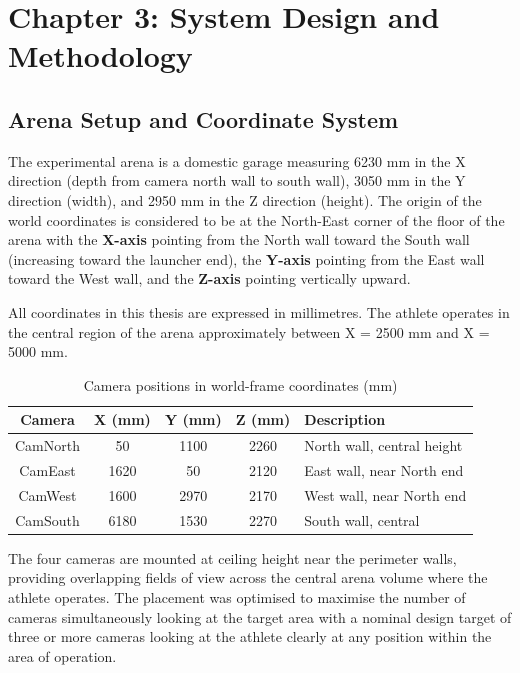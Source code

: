 \chapter{Chapter 3: System Design and Methodology}

\section{Arena Setup and Coordinate System}

The experimental arena is a domestic garage measuring 6230 mm in the X direction (depth from camera north wall to south wall), 3050 mm in the Y direction (width), and 2950 mm in the Z direction (height). The origin of the world coordinates is considered to be at the North-East corner of the floor of the arena with the \textbf{X-axis} pointing from the North wall toward the South wall (increasing toward the launcher end), the \textbf{Y-axis} pointing from the East wall toward the West wall, and the \textbf{Z-axis} pointing vertically upward.

All coordinates in this thesis are expressed in millimetres. The athlete operates in the central region of the arena approximately between X = 2500 mm and X = 5000 mm.

\begin{table}[htbp]
\caption{Camera positions in world-frame coordinates (mm)}
\label{tab:3_1}
\begin{tabular}{|c|c|c|c|p{3.5cm}|}
\hline
\textbf{Camera} & \textbf{X (mm)} & \textbf{Y (mm)} & \textbf{Z (mm)} & \textbf{Description} \\
\hline
CamNorth & 50 & 1100 & 2260 & North wall, central height \\
\hline
CamEast & 1620 & 50 & 2120 & East wall, near North end \\
\hline
CamWest & 1600 & 2970 & 2170 & West wall, near North end \\
\hline
CamSouth & 6180 & 1530 & 2270 & South wall, central \\
\hline
\end{tabular}
\end{table}

The four cameras are mounted at ceiling height near the perimeter walls, providing overlapping fields of view across the central arena volume where the athlete operates. The placement was optimised to maximise the number of cameras simultaneously looking at the target area with a nominal design target of three or more cameras looking at the athlete clearly at any position within the area of operation.

